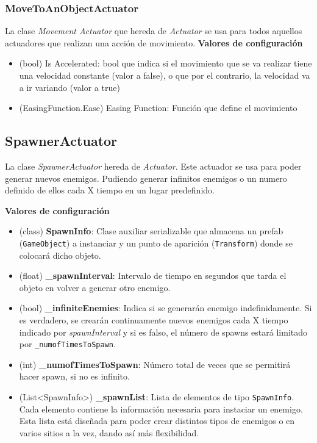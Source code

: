 \subsubsection{MoveToAnObjectActuator}
La clase \textit{Movement Actuator} que hereda de \textit{Actuator} se usa para todos aquellos actuadores que realizan una acción de movimiento.
\textbf{Valores de configuración}
\begin{itemize}
	\item (bool) Is Accelerated: bool que indica si el movimiento que se va realizar tiene una velocidad constante (valor a false), o que por el contrario, la velocidad va a ir variando (valor a true)
	\item (EasingFunction.Ease) Easing Function: Función que define el movimiento 
\end{itemize}

\subsection{SpawnerActuator}
La clase \textit{SpawnerActuator} hereda de \textit{Actuator}. Este actuador se usa para poder generar nuevos enemigos. Pudiendo generar infinitos enemigos o un numero definido de ellos cada X tiempo en un lugar predefinido.

\textbf{Valores de configuración}
\begin{itemize}
    \item (class) \textbf{SpawnInfo}: Clase auxiliar serializable que almacena un prefab (\texttt{GameObject}) a instanciar y un punto de aparición (\texttt{Transform}) donde se colocará dicho objeto.
    \item (float) \textbf{\_spawnInterval}: Intervalo de tiempo en segundos que tarda el objeto en volver a generar otro enemigo. 
    \item (bool) \textbf{\_infiniteEnemies}: Indica si se generarán enemigo indefinidamente. Si es verdadero, se crearán continuamente nuevos enemigos cada X tiempo indicado por  \textit{spawnInterval}  y si es falso, el número de spawns estará limitado por \texttt{\_numofTimesToSpawn}.
    \item (int) \textbf{\_numofTimesToSpawn}: Número total de veces que se permitirá hacer spawn, si no es infinito.
    \item (List<SpawnInfo>) \textbf{\_spawnList}: Lista de elementos de tipo \texttt{SpawnInfo}. Cada elemento contiene la información necesaria para instaciar un enemigo. Esta lista está diseñada para poder crear distintos tipos de enemigos o en varios sitios a la vez, dando así más flexibilidad.
\end{itemize}


